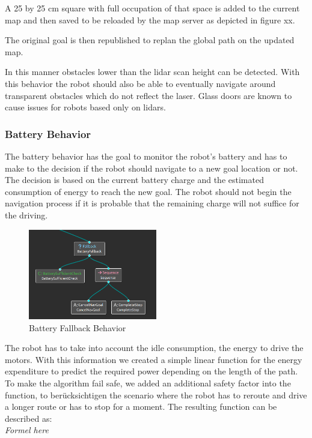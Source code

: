 A 25 by 25 cm square with full occupation of that space is added to the current map and then saved to be reloaded by the map server as depicted in figure xx. 

The original goal is then republished to replan the global path on the updated map. 

In this manner obstacles lower than the lidar scan height can be detected. With this behavior the robot should also be able to eventually navigate around transparent obstacles which do not reflect the laser. Glass doors are known to cause issues for robots based only on lidars. 

\subsubsection{Battery Behavior}

The battery behavior has the goal to monitor the robot's battery and has to make to the decision if the robot should navigate to a new goal location or not. The decision is based on the current battery charge and the estimated consumption of energy to reach the new goal. The robot should not begin the navigation process if it is probable that the remaining charge will not suffice for the driving.

\begin{figure}
	\includegraphics[width=0.5\textwidth]{images/battery_fallback.png}
	\caption{Battery Fallback Behavior}
\end{figure}
The robot has to take into account the idle consumption, the energy to drive the motors. With this information we created a simple linear function for the energy expenditure to predict the required power depending on the length of the path. To make the algorithm fail safe, we added an additional safety factor into the function, to berücksichtigen the scenario where the robot has to reroute and drive a longer route or has to stop for a moment. The resulting function can be described as: \\

\textit{Formel here}

